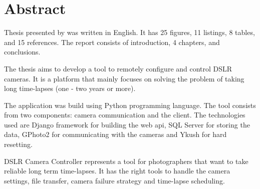 \section*{Abstract}

Thesis \textbf{\ThesisTitle} presented by \MyNameFull was written in English. It has 25 figures, 11 listings, 8 tables, and 15 references. The report consists of introduction, 4 chapters, and conclusions.

The thesis aims to develop a tool to remotely configure and control DSLR cameras. It is a platform that mainly focuses on solving the problem of taking long time-lapses (one - two years or more).

The application was build using Python programming language. The tool consists from two components: camera communication and the client. The technologies used are Django framework for building the web api, SQL Server for storing the data, GPhoto2 for communicating with the cameras and Ykush for hard resetting.

DSLR Camera Controller represents a tool for photographers that want to take reliable long term time-lapses. It has the right tools to handle the camera settings, file transfer, camera failure strategy and time-lapse scheduling.